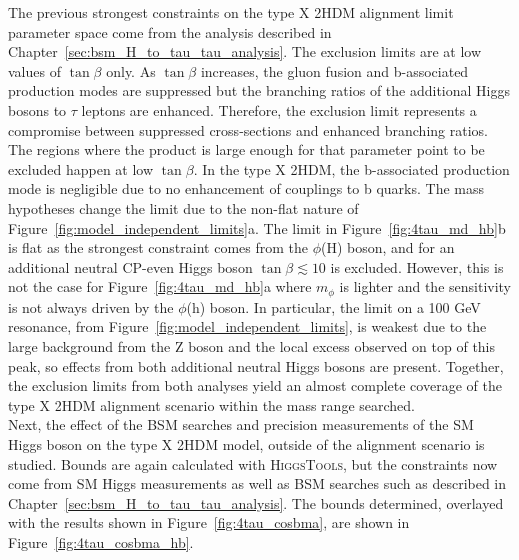 The previous strongest constraints on the type X \ac{2HDM} alignment limit parameter space come from the analysis described in Chapter~\ref{sec:bsm_H_to_tau_tau_analysis}.
The exclusion limits are at low values of $\tan\beta$ only.
As $\tan\beta$ increases, the gluon fusion and b-associated production modes are suppressed but the branching ratios of the additional Higgs bosons to $\tau$ leptons are enhanced.
Therefore, the exclusion limit represents a compromise between suppressed cross-sections and enhanced branching ratios. 
The regions where the product is large enough for that parameter point to be excluded happen at low $\tan\beta$.
In the type X \ac{2HDM}, the b-associated production mode is negligible due to no enhancement of couplings to b quarks.
The mass hypotheses change the limit due to the non-flat nature of Figure~\ref{fig:model_independent_limits}a.
The limit in Figure~\ref{fig:4tau_md_hb}b is flat as the strongest constraint comes from the $\phi$(H) boson, and for an additional neutral \ac{CP}-even Higgs boson $\tan\beta \lesssim 10$ is excluded.
However, this is not the case for Figure~\ref{fig:4tau_md_hb}a where $m_{\phi}$ is lighter and the sensitivity is not always driven by the $\phi$(h) boson.
In particular, the limit on a 100 GeV resonance, from Figure~\ref{fig:model_independent_limits}, is weakest due to the large background from the Z boson and the local excess observed on top of this peak, so effects from both additional neutral Higgs bosons are present.
Together, the exclusion limits from both analyses yield an almost complete coverage of the type X 2HDM alignment scenario within the mass range searched. \\

Next, the effect of the \ac{BSM} searches and precision measurements of the \ac{SM} Higgs boson on the type X \ac{2HDM} model, outside of the alignment scenario is studied.
Bounds are again calculated with \textsc{HiggsTools}, but the constraints now come from \ac{SM} Higgs measurements as well as \ac{BSM} searches such as described in Chapter~\ref{sec:bsm_H_to_tau_tau_analysis}.
The bounds determined, overlayed with the results shown in Figure~\ref{fig:4tau_cosbma}, are shown in Figure~\ref{fig:4tau_cosbma_hb}. \\

